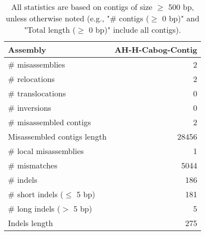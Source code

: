 \documentclass[12pt,a4paper]{article}
\begin{document}
\begin{table}[ht]
\begin{center}
\caption{All statistics are based on contigs of size $\geq$ 500 bp, unless otherwise noted (e.g., "\# contigs ($\geq$ 0 bp)" and "Total length ($\geq$ 0 bp)" include all contigs).}
\begin{tabular}{|l*{1}{|r}|}
\hline
Assembly & AH-H-Cabog-Contig \\ \hline
\# misassemblies & 2 \\ \hline
\hspace{5mm}\# relocations & 2 \\ \hline
\hspace{5mm}\# translocations & 0 \\ \hline
\hspace{5mm}\# inversions & 0 \\ \hline
\# misassembled contigs & 2 \\ \hline
Misassembled contigs length & 28456 \\ \hline
\# local misassemblies & 1 \\ \hline
\# mismatches & 5044 \\ \hline
\# indels & 186 \\ \hline
\hspace{5mm}\# short indels ($\leq$ 5 bp) & 181 \\ \hline
\hspace{5mm}\# long indels ($>$ 5 bp) & 5 \\ \hline
Indels length & 275 \\ \hline
\end{tabular}
\end{center}
\end{table}
\end{document}
